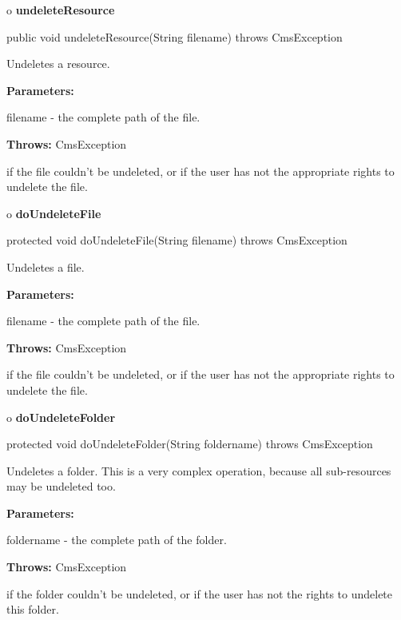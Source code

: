 o {\bf undeleteResource} 

\begin{PRE}
 public void undeleteResource(String filename) throws CmsException
\end{PRE}

\begin{description}
\htmlDD Undeletes a resource. 

\begin{description}
\item {\bf Parameters:}  

filename - the complete path of the file.  
\item {\bf Throws:} CmsException  

if the file couldn't be undeleted, or if the user has not the appropriate
rights to undelete the file.  
\end{description}

\end{description}

o {\bf doUndeleteFile} 

\begin{PRE}
 protected void doUndeleteFile(String filename) throws CmsException
\end{PRE}

\begin{description}
\htmlDD Undeletes a file. 

\begin{description}
\item {\bf Parameters:}  

filename - the complete path of the file.  
\item {\bf Throws:} CmsException  

if the file couldn't be undeleted, or if the user has not the appropriate
rights to undelete the file.  
\end{description}

\end{description}

o {\bf doUndeleteFolder} 

\begin{PRE}
 protected void doUndeleteFolder(String foldername) throws CmsException
\end{PRE}

\begin{description}
\htmlDD Undeletes a folder. \htmlBR
This is a very complex operation, because all sub-resources may be undeleted
too. 

\begin{description}
\item {\bf Parameters:}  

foldername - the complete path of the folder.  
\item {\bf Throws:} CmsException  

if the folder couldn't be undeleted, or if the user has not the rights to
undelete this folder.  
\end{description}

\end{description}

